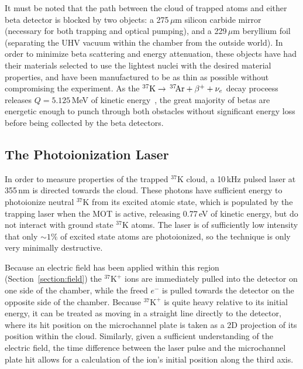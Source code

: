 It must be noted that the path between the cloud of trapped atoms and either beta detector is blocked by two objects:  a 275$\,\mu$m silicon carbide mirror (necessary for both trapping and optical pumping), and a 229$\,\mu$m beryllium foil (separating the UHV vacuum within the chamber from the outside world).  In order to minimize beta scattering and energy attenuation, these objects have had their materials selected to use the lightest nuclei with the desired material properties, and have been manufactured to be as thin as possible without compromising the experiment.  As the $^{37}\textrm{K} \rightarrow \,^{37}\textrm{\!Ar} + \beta^{+} + \nu_e$ decay proceess releases $Q=5.125$\,MeV of kinetic energy~\cite{Q_value}, the great majority of betas are energetic enough to punch through both obstacles without significant energy loss before being collected by the beta detectors.  




\subsection{The Photoionization Laser}
\label{cloud}
\label{photoions}

In order to measure properties of the trapped $^{37}\textrm{K}$ cloud, a 10\,kHz pulsed laser at 355\,nm is directed towards the cloud.  These photons have sufficient energy to photoionize neutral $^{37}\textrm{K}$ from its excited atomic state, which is populated by the trapping laser when the MOT is active, releasing 0.77\,eV of kinetic energy, but do not interact with ground state $^{37}\textrm{K}$ atoms.  The laser is of sufficiently low intensity that only $\sim 1\%$ of excited state atoms are photoionized, so the technique is only very minimally destructive.

Because an electric field has been applied within this region (Section~\ref{section:field}) the $^{37}\textrm{K}^+$ ions are immediately pulled into the detector on one side of the chamber, while the freed $e^-$ is pulled towards the detector on the opposite side of the chamber.  Because  $^{37}\textrm{K}^+$ is quite heavy relative to its initial energy, it can be treated as moving in a straight line directly to the detector, where its hit position on the microchannel plate is taken as a 2D projection of its position within the cloud.  Similarly, given a sufficient understanding of the electric field, the time difference between the laser pulse and the microchannel plate hit allows for a calculation of the ion's initial position along the third axis.  

